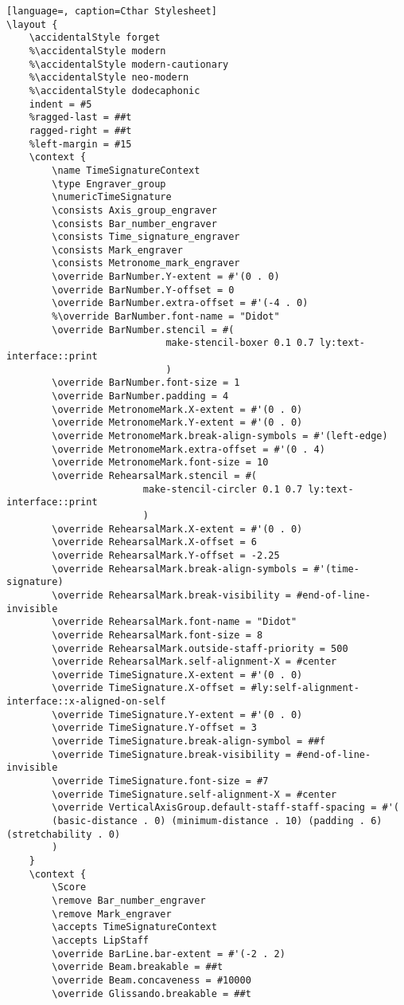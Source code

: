 \begin{lstlisting}[language=, caption=Cthar Stylesheet]
\layout {
    \accidentalStyle forget
	%\accidentalStyle modern
	%\accidentalStyle modern-cautionary
	%\accidentalStyle neo-modern
	%\accidentalStyle dodecaphonic
    indent = #5
	%ragged-last = ##t
    ragged-right = ##t
    %left-margin = #15
	\context {
        \name TimeSignatureContext
        \type Engraver_group
        \numericTimeSignature
        \consists Axis_group_engraver
		\consists Bar_number_engraver
        \consists Time_signature_engraver
		\consists Mark_engraver
		\consists Metronome_mark_engraver
		\override BarNumber.Y-extent = #'(0 . 0)
		\override BarNumber.Y-offset = 0
		\override BarNumber.extra-offset = #'(-4 . 0)
		%\override BarNumber.font-name = "Didot"
		\override BarNumber.stencil = #(
							make-stencil-boxer 0.1 0.7 ly:text-interface::print
							)
		\override BarNumber.font-size = 1
		\override BarNumber.padding = 4
		\override MetronomeMark.X-extent = #'(0 . 0)
		\override MetronomeMark.Y-extent = #'(0 . 0)
		\override MetronomeMark.break-align-symbols = #'(left-edge)
		\override MetronomeMark.extra-offset = #'(0 . 4)
		\override MetronomeMark.font-size = 10
		\override RehearsalMark.stencil = #(
						make-stencil-circler 0.1 0.7 ly:text-interface::print
						)
		\override RehearsalMark.X-extent = #'(0 . 0)
		\override RehearsalMark.X-offset = 6
		\override RehearsalMark.Y-offset = -2.25
		\override RehearsalMark.break-align-symbols = #'(time-signature)
		\override RehearsalMark.break-visibility = #end-of-line-invisible
		\override RehearsalMark.font-name = "Didot"
		\override RehearsalMark.font-size = 8
		\override RehearsalMark.outside-staff-priority = 500
		\override RehearsalMark.self-alignment-X = #center
        \override TimeSignature.X-extent = #'(0 . 0)
        \override TimeSignature.X-offset = #ly:self-alignment-interface::x-aligned-on-self
        \override TimeSignature.Y-extent = #'(0 . 0)
		\override TimeSignature.Y-offset = 3
        \override TimeSignature.break-align-symbol = ##f
        \override TimeSignature.break-visibility = #end-of-line-invisible
        \override TimeSignature.font-size = #7
        \override TimeSignature.self-alignment-X = #center
        \override VerticalAxisGroup.default-staff-staff-spacing = #'(
		(basic-distance . 0) (minimum-distance . 10) (padding . 6) (stretchability . 0)
		)
    }
    \context {
        \Score
        \remove Bar_number_engraver
		\remove Mark_engraver
        \accepts TimeSignatureContext
		\accepts LipStaff
		\override BarLine.bar-extent = #'(-2 . 2)
        \override Beam.breakable = ##t
		\override Beam.concaveness = #10000
		\override Glissando.breakable = ##t

\end{lstlisting}
